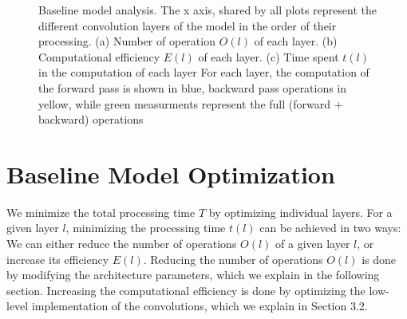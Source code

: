 \documentclass[runningheads]{llncs}
\begin{document}
\begin{figure}[h]
\centering
{}%
%
%
\centering
\caption{
Baseline model analysis. The x axis, shared by all plots represent the different convolution layers of the model in the order of their processing. 
(a) Number of operation $O(l)$ of each layer. 
(b) Computational efficiency $E(l)$ of each layer.
(c) Time spent $t(l)$ in the computation of each layer
For each layer, the computation of the forward pass is shown in blue, 
backward pass operations in yellow, 
while green measurments represent the full (forward + backward) operations
}
\end{figure}

\section{Baseline Model Optimization}

We minimize the total processing time $T$ by optimizing individual layers.
For a given layer $l$, minimizing the processing time $ t(l) $ can be achieved in two ways:
We can either reduce the number of operations $O(l)$ of a given layer $l$, or increase its efficiency $E(l)$.
Reducing the number of operations $O(l)$ is done by modifying the architecture parameters, which we explain in the following section.
Increasing the computational efficiency is done by optimizing the low-level implementation of the convolutions, which we explain in Section 3.2.
\end{document}
